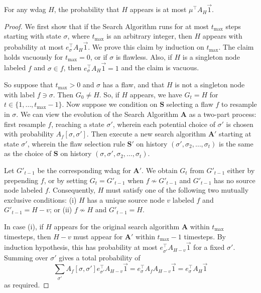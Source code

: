 \documentclass{toc}
\begin{document}
\begin{lemma}
  \label{witness-tree-lemma_simple}
For any wdag $H$, the probability that $H$ appears is at most $\mu^{\top} A_H \vec 1$.
\end{lemma}
\begin{proof}
We first show that if the Search Algorithm runs for at most $t_{\max}$ steps starting with state $\sigma$, where $t_{\max}$ is an arbitrary integer, then $H$ appears with probability at most $e_{\sigma}^{\top} A_H \vec 1.$ We prove this claim by induction on $t_{\max}$.  The claim holds vacuously for $t_{\max} = 0$, or if $\sigma$ is flawless. Also, if $H$ is a singleton node labeled $f$ and $\sigma \in f$, then $e_{\sigma}^{\top} A_H \vec 1 = 1$ and the claim is vacuous.  

So suppose that $t_{\max} > 0$ and $\sigma$ has a flaw, and that $H$ is not a singleton node with label $f \ni \sigma$.  Then $G_0 \neq H$. So, if $H$ appears,  we have $G_t = H$ for  $t  \in \{1, \dots,  t_{\max} -1 \}$. Now suppose we condition on $\mathbf S$ selecting a flaw $f$ to resample in $\sigma$.  We can view the evolution of the Search Algorithm $\mathbf A$ as a two-part process: first resample $f$, reaching a state $\sigma'$, wherein each potential choice of $\sigma'$ is chosen with probability $A_f[\sigma, \sigma']$. Then execute a new search algorithm $\mathbf A'$ starting at state $\sigma'$, wherein the flaw selection rule $\mathbf S'$ on history $(\sigma', \sigma_2,  \dots, \sigma_t)$ is the same as the choice of $\mathbf S$ on history $(\sigma, \sigma', \sigma_2, \dots, \sigma_t)$.   

 Let $G'_{t-1}$ be the corresponding wdag for $\mathbf A'$. We obtain $G_t$ from $G'_{t-1}$ either by prepending $f$, or by setting $G_t = G'_{t-1}$ when $f \not \sim G'_{t-1}$ and $G'_{t-1}$ has no source node labeled $f$. Consequently, $H$ must satisfy one of the following two mutually exclusive conditions: (i) $H$ has a unique source node $v$ labeled $f$ and $G'_{t-1} = H - v$; or  (ii) $f \not \sim H$ and  $G'_{t-1} = H$.

In case (i), if $H$ appears for the original search algorithm $\mathbf A$ within $t_{\max}$ timesteps, then   $H-v$ must appear for $\mathbf A'$ within $t_{\max}-1$ timesteps. By induction hypothesis, this has  probability at most $e_{\sigma'}^{\top} A_{H-v} \vec 1$ for a fixed $\sigma'$. Summing over $\sigma'$ gives a total probability of 
$$
\sum_{\sigma'} A_f[\sigma, \sigma'] e_{\sigma'}^{\top} A_{H-v} \vec 1 = e_{\sigma}^{\top} A_f  A_{H-v} \vec 1 = e_{\sigma}^{\top} A_H \vec 1
$$
as required.


\end{proof}
\end{document}
